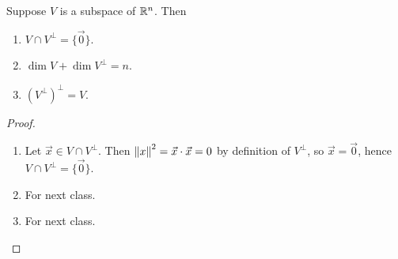 \documentclass[main.tex]{subfiles}
\begin{document}
\begin{theorem}
    Suppose $V$ is a subspace of $\mathbb R^n$. Then
    \begin{enumerate}
        \item $V \cap V^\perp = \{\vec{0}\}$.
        \item $\dim V + \dim V^\perp = n$.
        \item $(V^\perp)^\perp = V$.
    \end{enumerate}
\end{theorem}
\begin{proof}
    \begin{enumerate}
        \item Let $\vec{x}\in V\cap V^\perp$. Then $\left\lVert x \right\rVert^2 = \vec{x}\cdot \vec{x} = 0$ by definition of $V^\perp$, so $\vec{x} = \vec{0}$, hence $V\cap V^\perp = \{\vec{0}\}$.
        \item For next class.
        \item For next class. \qedhere
    \end{enumerate}
\end{proof}
\end{document}
